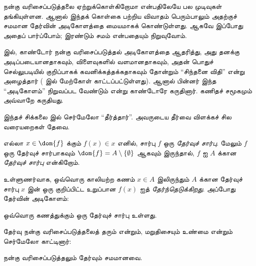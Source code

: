 \documentclass[../../../include/open-logic-section]{subfiles}
\begin{document}

நன்கு வரிசைப்படுத்தலை ஏற்றுக்கொள்கிறோமா என்பதிலேயே
பல முடிவுகள் தங்கியுள்ளன. ஆனால் இந்தக் கொள்கை பற்றிய
விவாதம் பெரும்பாலும் அதற்குச் சமமான தேர்வின் அடிகோளத்தை
மையமாகக் கொண்டுள்ளது. ஆகவே இப்போது அதைப் பார்ப்போம்;
இரண்டும் சமம் என்பதையும் நிறுவுவோம்.

\citeyear{Cantor1883} இல், காண்டோர் நன்கு வரிசைப்படுத்தல்
அடிகோளத்தை ஆதரித்து, அது தனக்கு அடிப்படையானதாகவும்,
விளைவுகளில் வளமானதாகவும், அதன் பொதுச் செல்லுபடியில்
குறிப்பாகக் கவனிக்கத்தக்கதாகவும் தோன்றும் ``சிந்தனை விதி''
என்று அழைத்தார் (\citeauthor{Potter2004}
\citeyear[p.~243]{Potter2004} இல் மேற்கோள் காட்டப்பட்டுள்ளது).
ஆனால் பின்னர் இந்த ``அடிகோளம்'' நிறுவப்பட வேண்டும் என்று
காண்டோரே கருதினார். கணிதச் சமூகமும் அவ்வாறே கருதியது.

இந்தச் சிக்கலை \citeyear{Zermelo1904} இல் செர்மேலோ
``தீர்த்தார்''. அவருடைய தீர்வை விளக்கச் சில வரையறைகள் தேவை.

\begin{defn}
எல்லா $x \in \dom{f}$ க்கும் $f(x) \in x$ எனில்,
சார்பு $f$ ஒரு \emph{தேர்வுச் சார்பு}. மேலும் $f$ ஒரு தேர்வுச்
சார்பாகவும் $\dom{f} = A \setminus \{\emptyset\}$ ஆகவும்
இருந்தால், $f$ ஐ $A$ க்கான \emph{தேர்வுச் சார்பு} என்கிறோம்.
\end{defn}

உள்ளுணர்வாக, ஒவ்வொரு காலியற்ற கணம்
$x \in A$ இலிருந்தும் $A$ க்கான தேர்வுச் சார்பு $x$ இன்
ஒரு குறிப்பிட்ட உறுப்பான $f(x)$ ஐத் \emph{தேர்ந்தெடுக்கிறது}. அப்போது
தேர்வின் அடிகோளம்:

\begin{axiom}[தேர்வு]
	ஒவ்வொரு கணத்துக்கும் ஒரு தேர்வுச் சார்பு உள்ளது.
\end{axiom}

தேர்வு நன்கு வரிசைப்படுத்தலைத் தரும் என்றும், மறுதிசையும்
உண்மை என்றும் செர்மேலோ காட்டினார்:

\begin{thm}[$\ZF$ இல்]
நன்கு வரிசைப்படுத்தலும் தேர்வும் சமமானவை.
\end{thm}
\end{document}
